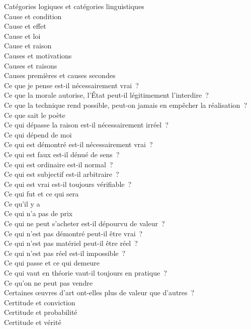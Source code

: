 \documentclass[a4paper,12pt]{article}
\begin{document}
Catégories logiques et catégories linguistiques \\
Cause et condition \\
Cause et effet \\
Cause et loi \\
Cause et raison \\
Causes et motivations \\
Causes et raisons \\
Causes premières et causes secondes \\
Ce que je pense est-il nécessairement vrai ? \\
Ce que la morale autorise, l'État peut-il légitimement l'interdire ? \\
Ce que la technique rend possible, peut-on jamais en empêcher la réalisation ? \\
Ce que sait le poète \\
Ce qui dépasse la raison est-il nécessairement irréel ? \\
Ce qui dépend de moi \\
Ce qui est démontré est-il nécessairement vrai ? \\
Ce qui est faux est-il dénué de sens ? \\
Ce qui est ordinaire est-il normal ? \\
Ce qui est subjectif est-il arbitraire ? \\
Ce qui est vrai est-il toujours vérifiable ? \\
Ce qui fut et ce qui sera \\
Ce qu'il y a \\
Ce qui n'a pas de prix \\
Ce qui ne peut s'acheter est-il dépourvu de valeur ? \\
Ce qui n'est pas démontré peut-il être vrai ? \\
Ce qui n'est pas matériel peut-il être réel ? \\
Ce qui n'est pas réel est-il impossible ? \\
Ce qui passe et ce qui demeure \\
Ce qui vaut en théorie vaut-il toujours en pratique ? \\
Ce qu'on ne peut pas vendre \\
Certaines œuvres d'art ont-elles plus de valeur que d'autres ? \\
Certitude et conviction \\
Certitude et probabilité \\
Certitude et vérité \\
\end{document}
